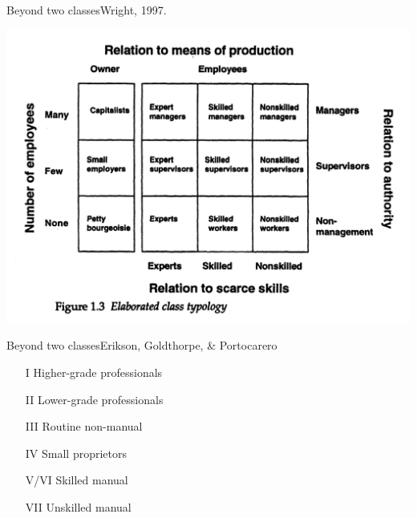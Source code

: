 \documentclass{beamer}
\newcommand\bref[2]{\href{#1}{\color{blue}{#2}}}
\begin{document}
\begin{frame}{Beyond two classes}{Wright, 1997. \bref{https://www-fulcrum-org.proxy.library.cornell.edu/epubs/8c97kt056}{Class Counts}}

\includegraphics[height = .8\textheight]{wright_classes}

\end{frame}


\begin{frame}{Beyond two classes}{Erikson, Goldthorpe, \& Portocarero \bref{https://www.jstor.org/stable/589632}{1979}}

\begin{itemize}
\item[I] Higher-grade professionals
\item[II] Lower-grade professionals
\item[III] Routine non-manual
\item[IV] Small proprietors
\item[V/VI] Skilled manual
\item[VII] Unskilled manual
\end{itemize}

\end{frame}
\end{document}
